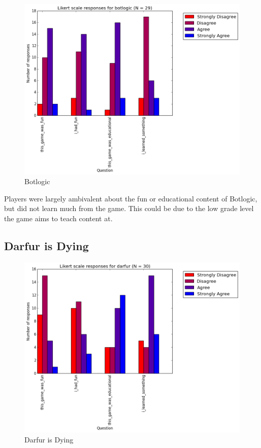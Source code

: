 				\begin{figure}[] 
				\centering 
				\includegraphics[width=\textwidth, height=.4\textheight, keepaspectratio=true]{botlogic_likert.png} 
				\caption{Botlogic}
				\end{figure}

				Players were largely ambivalent about the fun or educational content of Botlogic, but did not learn much from the game. This could be due to the low grade level the game aims to teach content at. 

			\subsection{Darfur is Dying}

				\begin{figure}[] 
				\centering 
				\includegraphics[width=\textwidth, height=.4\textheight, keepaspectratio=true]{darfur_likert.png} 
				\caption{Darfur is Dying}
				\end{figure}

